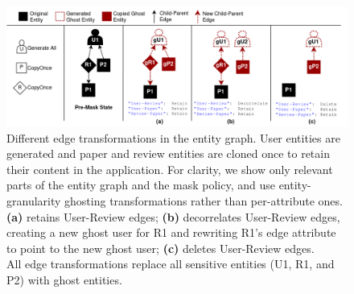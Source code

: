 \begin{figure}[t!]
    \centering
    \includegraphics[width=\textwidth]{img/edge_transforms}

    \caption{Different edge transformations in the entity graph. User entities are generated and
    paper and review entities are cloned once to retain their content in the application. 
    For clarity, we show only relevant parts of the entity graph and the mask policy, and use entity-granularity ghosting
        transformations rather than per-attribute ones.\\
    \textbf{(a)} retains User-Review edges;
    \textbf{(b)} decorrelates User-Review edges, creating a new ghost user for R1 and rewriting R1's 
    edge attribute to point to the new ghost user;
    \textbf{(c)} deletes User-Review edges.\\
    All edge transformations replace all sensitive entities (U1, R1, and P2) with ghost entities.
    }
    \label{fig:edgepol}
\end{figure}

